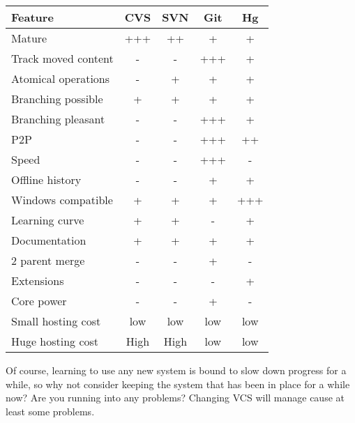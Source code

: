 \begin{tabular}{|l|c|c|c|c|}
\hline
Feature             & CVS & SVN & Git & Hg\\
\hline
Mature              & +++ & ++  &  +  & + \\
Track moved content &  -  &  -  & +++ & + \\ %
Atomical operations &  -  &  +  &  +  & + \\ 
Branching possible  &  +  &  +  &  +  & + \\
Branching pleasant  &  -  &  -  & +++ & + \\
P2P                 &  -  &  -  & +++ & ++\\ %
Speed               &  -  &  -  & +++ & - \\
Offline history     &  -  &  -  &  +  & + \\
Windows compatible  &  +  &  +  &  +  &+++\\
Learning curve      &  +  &  +  &  -  & + \\
Documentation       &  +  &  +  &  +  & + \\ %
2 parent merge      &  -  &  -  &  +  & - \\
Extensions          &  -  &  -  &  -  & + \\
Core power          &  -  &  -  &  +  & - \\
Small hosting cost  & low & low & low &low\\
Huge hosting cost   &High &High &low&low\\
\end{tabular}


Of course, learning to use any new system is bound to slow down progress for a while, so why not consider 
keeping the system that has been in place for a while now? Are you running into any problems? Changing VCS
will manage cause at least some problems.

